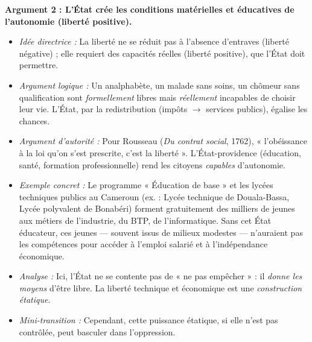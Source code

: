 \documentclass[11pt]{article}
\begin{document}
\begin{exoresolu}
\medskip
\textbf{Argument 2 : L'État crée les conditions matérielles et éducatives de l'autonomie (liberté positive).}
\begin{itemize}
    \item \textit{Idée directrice :} La liberté ne se réduit pas à l'absence d'entraves (liberté négative) ; elle requiert des capacités réelles (liberté positive), que l'État doit permettre.
    \item \textit{Argument logique :} Un analphabète, un malade sans soins, un chômeur sans qualification sont \emph{formellement} libres mais \emph{réellement} incapables de choisir leur vie. L'État, par la redistribution (impôts $\to$ services publics), égalise les chances.
    \item \textit{Argument d'autorité :} Pour Rousseau (\emph{Du contrat social}, 1762), « l'obéissance à la loi qu'on s'est prescrite, c'est la liberté ». L'État-providence (éducation, santé, formation professionnelle) rend les citoyens \emph{capables} d'autonomie.
    \item \textit{Exemple concret :} Le programme « Éducation de base » et les lycées techniques publics au Cameroun (ex. : Lycée technique de Douala-Bassa, Lycée polyvalent de Bonabéri) forment gratuitement des milliers de jeunes aux métiers de l'industrie, du BTP, de l'informatique. Sans cet État éducateur, ces jeunes — souvent issus de milieux modestes — n'auraient pas les compétences pour accéder à l'emploi salarié et à l'indépendance économique.
    \item \textit{Analyse :} Ici, l'État ne se contente pas de « ne pas empêcher » : il \emph{donne les moyens} d'être libre. La liberté technique et économique est une \emph{construction étatique}.
    \item \textit{Mini-transition :} Cependant, cette puissance étatique, si elle n'est pas contrôlée, peut basculer dans l'oppression.
\end{itemize}


\end{exoresolu}
\end{document}
